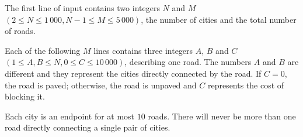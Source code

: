 The first line of input contains two integers $N$ and $M$ $(2 \le N \le 1\,000, N - 1 \le M \le 5\,000)$, the number of cities and the total number of roads.

Each of the following $M$ lines contains three integers $A$, $B$ and $C$ $(1 \le A, B \le N, 0 \le C \le 10\,000)$, describing one road. The numbers $A$ and $B$ are different and they represent the cities directly connected by the road. If $C = 0$, the road is paved; otherwise, the road is unpaved and $C$ represents the cost of blocking it.

Each city is an endpoint for at most $10$ roads. There will never be more than one road directly connecting a single pair of cities.